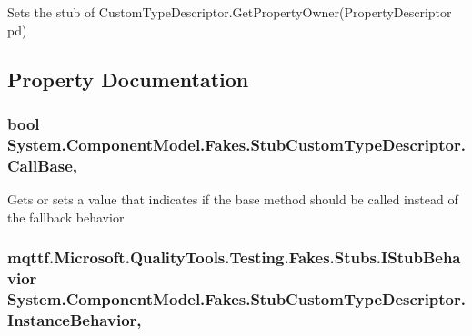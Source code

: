 Sets the stub of Custom\-Type\-Descriptor.\-Get\-Property\-Owner(\-Property\-Descriptor pd)



\subsection{Property Documentation}
\hypertarget{class_system_1_1_component_model_1_1_fakes_1_1_stub_custom_type_descriptor_a9ff7276d8bbc8311206597c94e8f4d63}{
\subsubsection[{Call\-Base}]{\setlength{\rightskip}{0pt plus 5cm}bool System.\-Component\-Model.\-Fakes.\-Stub\-Custom\-Type\-Descriptor.\-Call\-Base\hspace{0.3cm}{\ttfamily [get]}, {\ttfamily [set]}}}\label{class_system_1_1_component_model_1_1_fakes_1_1_stub_custom_type_descriptor_a9ff7276d8bbc8311206597c94e8f4d63}


Gets or sets a value that indicates if the base method should be called instead of the fallback behavior

\hypertarget{class_system_1_1_component_model_1_1_fakes_1_1_stub_custom_type_descriptor_a0f5dff5ca3c8a624e4cf35296e8cd2b4}{
\subsubsection[{Instance\-Behavior}]{\setlength{\rightskip}{0pt plus 5cm}mqttf.\-Microsoft.\-Quality\-Tools.\-Testing.\-Fakes.\-Stubs.\-I\-Stub\-Behavior System.\-Component\-Model.\-Fakes.\-Stub\-Custom\-Type\-Descriptor.\-Instance\-Behavior\hspace{0.3cm}{\ttfamily [get]}, {\ttfamily [set]}}}\label{class_system_1_1_component_model_1_1_fakes_1_1_stub_custom_type_descriptor_a0f5dff5ca3c8a624e4cf35296e8cd2b4}


